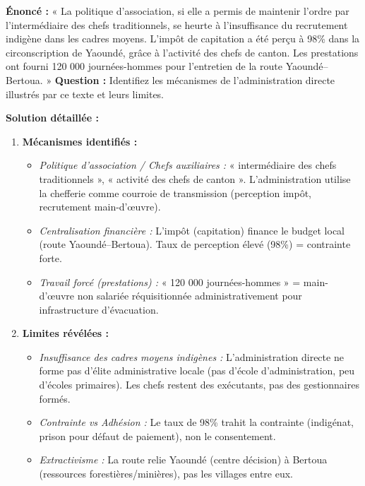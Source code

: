 \documentclass[11pt]{article}
\begin{document}
\begin{exoresolu}
\textbf{Énoncé :} « La politique d'association, si elle a permis de maintenir l'ordre par l'intermédiaire des chefs traditionnels, se heurte à l'insuffisance du recrutement indigène dans les cadres moyens. L'impôt de capitation a été perçu à 98\% dans la circonscription de Yaoundé, grâce à l'activité des chefs de canton. Les prestations ont fourni 120 000 journées-hommes pour l'entretien de la route Yaoundé–Bertoua. »
\textbf{Question :} Identifiez les mécanismes de l'administration directe illustrés par ce texte et leurs limites.

\tcblower
\textbf{Solution détaillée :}
\begin{enumerate}
    \item \textbf{Mécanismes identifiés :}
    \begin{itemize}
        \item \emph{Politique d'association / Chefs auxiliaires :} « intermédiaire des chefs traditionnels », « activité des chefs de canton ». L'administration utilise la chefferie comme courroie de transmission (perception impôt, recrutement main-d'œuvre).
        \item \emph{Centralisation financière :} L'impôt (capitation) finance le budget local (route Yaoundé–Bertoua). Taux de perception élevé (98\%) = contrainte forte.
        \item \emph{Travail forcé (prestations) :} « 120 000 journées-hommes » = main-d'œuvre non salariée réquisitionnée administrativement pour infrastructure d'évacuation.
    \end{itemize}
    \item \textbf{Limites révélées :}
    \begin{itemize}
        \item \emph{Insuffisance des cadres moyens indigènes :} L'administration directe ne forme pas d'élite administrative locale (pas d'école d'administration, peu d'écoles primaires). Les chefs restent des exécutants, pas des gestionnaires formés.
        \item \emph{Contrainte vs Adhésion :} Le taux de 98\% trahit la contrainte (indigénat, prison pour défaut de paiement), non le consentement.
        \item \emph{Extractivisme :} La route relie Yaoundé (centre décision) à Bertoua (ressources forestières/minières), pas les villages entre eux.
    \end{itemize}
\end{enumerate}
\end{exoresolu}
\end{document}
